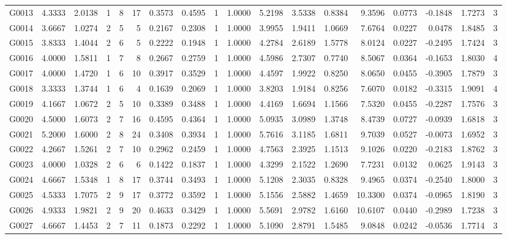 \begin{tabular}{lrrrrrrrrrrrrrrrrr}
G0013 & 4.3333 & 2.0138 & 1 & 8 & 17 & 0.3573 & 0.4595 & 1 & 1.0000 & 5.2198 & 3.5338 & 0.8384 & 9.3596 & 0.0773 & -0.1848 & 1.7273 & 3 \\
G0014 & 3.6667 & 1.0274 & 2 & 5 & 5 & 0.2167 & 0.2308 & 1 & 1.0000 & 3.9955 & 1.9411 & 1.0669 & 7.6764 & 0.0227 & 0.0478 & 1.8485 & 3 \\
G0015 & 3.8333 & 1.4044 & 2 & 6 & 5 & 0.2222 & 0.1948 & 1 & 1.0000 & 4.2784 & 2.6189 & 1.5778 & 8.0124 & 0.0227 & -0.2495 & 1.7424 & 3 \\
G0016 & 4.0000 & 1.5811 & 1 & 7 & 8 & 0.2667 & 0.2759 & 1 & 1.0000 & 4.5986 & 2.7307 & 0.7740 & 8.5067 & 0.0364 & -0.1653 & 1.8030 & 4 \\
G0017 & 4.0000 & 1.4720 & 1 & 6 & 10 & 0.3917 & 0.3529 & 1 & 1.0000 & 4.4597 & 1.9922 & 0.8250 & 8.0650 & 0.0455 & -0.3905 & 1.7879 & 3 \\
G0018 & 3.3333 & 1.3744 & 1 & 6 & 4 & 0.1639 & 0.2069 & 1 & 1.0000 & 3.8203 & 1.9184 & 0.8256 & 7.6070 & 0.0182 & -0.3315 & 1.9091 & 4 \\
G0019 & 4.1667 & 1.0672 & 2 & 5 & 10 & 0.3389 & 0.3488 & 1 & 1.0000 & 4.4169 & 1.6694 & 1.1566 & 7.5320 & 0.0455 & -0.2287 & 1.7576 & 3 \\
G0020 & 4.5000 & 1.6073 & 2 & 7 & 16 & 0.4595 & 0.4364 & 1 & 1.0000 & 5.0935 & 3.0989 & 1.3748 & 8.4739 & 0.0727 & -0.0939 & 1.6818 & 3 \\
G0021 & 5.2000 & 1.6000 & 2 & 8 & 24 & 0.3408 & 0.3934 & 1 & 1.0000 & 5.7616 & 3.1185 & 1.6811 & 9.7039 & 0.0527 & -0.0073 & 1.6952 & 3 \\
G0022 & 4.2667 & 1.5261 & 2 & 7 & 10 & 0.2962 & 0.2459 & 1 & 1.0000 & 4.7563 & 2.3925 & 1.1513 & 9.1026 & 0.0220 & -0.2183 & 1.8762 & 3 \\
G0023 & 4.0000 & 1.0328 & 2 & 6 & 6 & 0.1422 & 0.1837 & 1 & 1.0000 & 4.3299 & 2.1522 & 1.2690 & 7.7231 & 0.0132 & 0.0625 & 1.9143 & 3 \\
G0024 & 4.6667 & 1.5348 & 1 & 8 & 17 & 0.3744 & 0.3493 & 1 & 1.0000 & 5.1208 & 2.3035 & 0.8328 & 9.4965 & 0.0374 & -0.2540 & 1.8000 & 3 \\
G0025 & 4.5333 & 1.7075 & 2 & 9 & 17 & 0.3772 & 0.3592 & 1 & 1.0000 & 5.1556 & 2.5882 & 1.4659 & 10.3300 & 0.0374 & -0.0965 & 1.8190 & 3 \\
G0026 & 4.9333 & 1.9821 & 2 & 9 & 20 & 0.4633 & 0.3429 & 1 & 1.0000 & 5.5691 & 2.9782 & 1.6160 & 10.6107 & 0.0440 & -0.2989 & 1.7238 & 3 \\
G0027 & 4.6667 & 1.4453 & 2 & 7 & 11 & 0.1873 & 0.2292 & 1 & 1.0000 & 5.1090 & 2.8791 & 1.5485 & 9.0848 & 0.0242 & -0.0536 & 1.7714 & 3 \\

\end{tabular}
